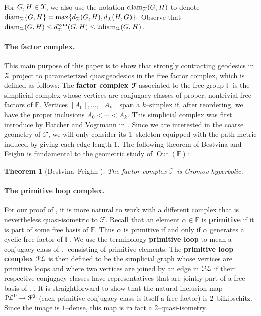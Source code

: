 \documentclass[letterpaper,fleqn]{article}
\theoremstyle{plain}
\newtheorem{theorem}{Theorem}[section]
\theoremstyle{definition}
\newcommand{\define}[1]{\textbf{#1}}
\DeclareMathOperator{\diam}{diam}
\DeclareMathOperator{\Out}{Out}
\newcommand{\free}{\mathbb{F}} %
\newcommand{\factor}{{\EuScript F}} %
\newcommand{\F}{\factor} %
\newcommand{\fc}{\factor} %
\newcommand{\pl}{{\EuScript{PL}}} %
\newcommand{\os}{{\EuScript X}} %
\newcommand{\X}{\os}
\newcommand{\dsym}{d^{\mathrm{sym}}_\os} %
\renewcommand{\diam}{\mathrm{diam}}
\begin{document}
\noindent For $G,H \in \X$, we also use the notation $\diam_\X (G,H)$ to denote $\diam_{\X} \{G,H\} = \max \{ d_\X(G,H) ,d_\X(H,G)\} .$ Observe that $\diam_\X(G,H) \le \dsym(G,H) \le 2\diam_\X(G,H)$.

\paragraph{The factor complex.}
This main purpose of this paper is to show that strongly contracting geodesics in $\X$ project to parameterized quasigeodesics in the free factor complex, which is defined as follows: 
The \define{factor complex} $\F$ associated to the free group $\free$ is the simplicial complex whose vertices are conjugacy classes of proper, nontrivial free factors of $\free$. Vertices $[A_0] ,\ldots, [A_k]$ span a $k$--simplex if, after reordering, we have the proper inclusions $A_0 <  \dotsb < A_k$. This simplicial complex was first introduce by Hatcher and Vogtmann in \cite{HVff}. Since we are interested in the coarse geometry of $\F$, we will only consider its $1$--skeleton equipped with the path metric induced by giving each edge length $1$. The following theorem of Bestvina and Feighn is fundamental to the geometric study of $\Out(\free)$:

\begin{theorem}[Bestvina--Feighn \cite{BFhyp}]
The factor complex $\F$ is Gromov hyperbolic.
\end{theorem}

\paragraph{The primitive loop complex.}
For our proof of , it is more natural to work with a different complex that is nevertheless quasi-isometric to $\F$. Recall that an element $\alpha\in \free$ is \define{primitive} if it is part of some free basis of $\free$. Thus $\alpha$ is primitive if and only if $\alpha$ generates a cyclic free factor of $\free$. We use the terminology \define{primitive loop} to mean a conjugacy class of $\free$ consisting of primitive elements. The \define{primitive loop complex} $\pl$ is then defined to be the simplicial graph whose vertices are primitive loops and where two vertices are joined by an edge in $\pl$ if their respective conjugacy classes have representatives that are jointly part of a free basis of $\free$. It is straightforward to show that the natural inclusion map $\pl^0 \to \fc^0$ (each primitive conjugacy class is itself a free factor) is $2$--biLipschitz. Since the image is $1$--dense, this map is in fact a $2$--quasi-isometry. 
\end{document}
